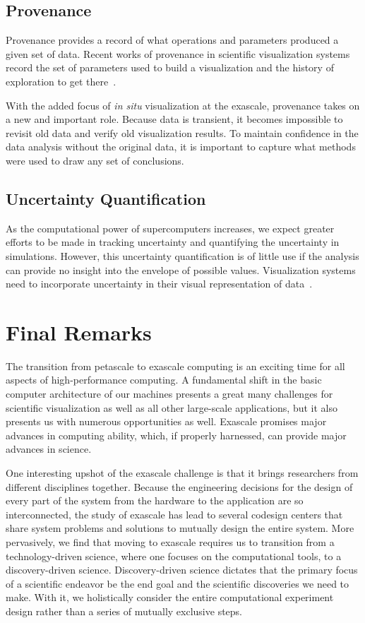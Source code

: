 \documentclass[conference]{IEEEtran}
\newcommand*{\lcite}[1]{~\cite{#1}}
\newcommand{\insitu}{{\it in situ}\xspace}
\begin{document}
\subsection{Provenance}

\noindent
Provenance provides a record of what operations and parameters produced a
given set of data.  Recent works of provenance in scientific visualization
systems record the set of parameters used to build a visualization and the
history of exploration to get there\lcite{JankunKelly2002,VisTrails}.

With the added focus of \insitu visualization at the exascale, provenance
takes on a new and important role.  Because data is transient, it becomes
impossible to revisit old data and verify old visualization results.  To
maintain confidence in the data analysis without the original data, it is
important to capture what methods were used to draw any set of
conclusions.

\subsection{Uncertainty Quantification}

\noindent
As the computational power of supercomputers increases, we expect greater
efforts to be made in tracking uncertainty and quantifying the uncertainty
in simulations.  However, this uncertainty quantification is of little use
if the analysis can provide no insight into the envelope of possible
values.  Visualization systems need to incorporate uncertainty in their
visual representation of data\lcite{Potter2012}.

\section{Final Remarks}
\label{sec:Conclusion}

\noindent
The transition from petascale to exascale computing is an exciting time for
all aspects of high-performance computing.  A fundamental shift in the
basic computer architecture of our machines presents a great many
challenges for scientific visualization as well as all other large-scale
applications, but it also presents us with numerous opportunities as well.
Exascale promises major advances in computing ability, which, if properly
harnessed, can provide major advances in science.

One interesting upshot of the exascale challenge is that it brings
researchers from different disciplines together.  Because the engineering
decisions for the design of every part of the system from the hardware to
the application are so interconnected, the study of exascale has lead to
several codesign centers that share system problems and solutions to
mutually design the entire system.  More pervasively, we find that moving
to exascale requires us to transition from a technology-driven science,
where one focuses on the computational tools, to a discovery-driven
science.  Discovery-driven science dictates that the primary focus of a
scientific endeavor be the end goal and the scientific discoveries we need
to make.  With it, we holistically consider the entire computational
experiment design rather than a series of mutually exclusive steps.
\end{document}
